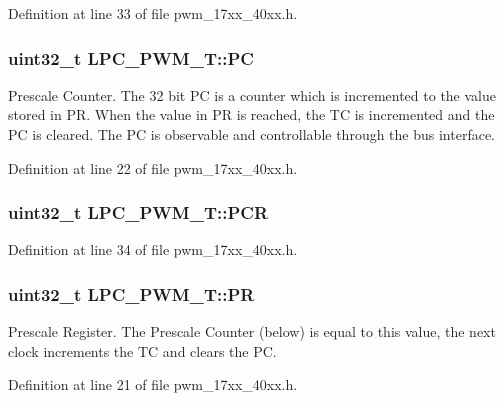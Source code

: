 Definition at line 33 of file pwm\+\_\+17xx\+\_\+40xx.\+h.

\subsubsection[{\texorpdfstring{PC}{PC}}]{ uint32\+\_\+t L\+P\+C\+\_\+\+P\+W\+M\+\_\+\+T\+::\+PC}\hypertarget{structLPC__PWM__T_af5746645a562488fc02d1f4c05910e0e}{}\label{structLPC__PWM__T_af5746645a562488fc02d1f4c05910e0e}
Prescale Counter. The 32 bit PC is a counter which is incremented to the value stored in PR. When the value in PR is reached, the TC is incremented and the PC is cleared. The PC is observable and controllable through the bus interface. 

Definition at line 22 of file pwm\+\_\+17xx\+\_\+40xx.\+h.

\subsubsection[{\texorpdfstring{P\+CR}{PCR}}]{ uint32\+\_\+t L\+P\+C\+\_\+\+P\+W\+M\+\_\+\+T\+::\+P\+CR}\hypertarget{structLPC__PWM__T_a242485f18e62428c32fb61b4680a1772}{}\label{structLPC__PWM__T_a242485f18e62428c32fb61b4680a1772}


Definition at line 34 of file pwm\+\_\+17xx\+\_\+40xx.\+h.

\subsubsection[{\texorpdfstring{PR}{PR}}]{ uint32\+\_\+t L\+P\+C\+\_\+\+P\+W\+M\+\_\+\+T\+::\+PR}\hypertarget{structLPC__PWM__T_a8ffa99e04366429b8ae53ba115de716b}{}\label{structLPC__PWM__T_a8ffa99e04366429b8ae53ba115de716b}
Prescale Register. The Prescale Counter (below) is equal to this value, the next clock increments the TC and clears the PC. 

Definition at line 21 of file pwm\+\_\+17xx\+\_\+40xx.\+h.

